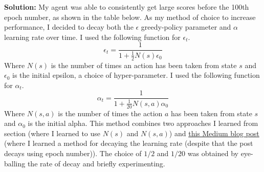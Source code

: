 \documentclass[submit]{harvardml}
\begin{document}
\newpage
\textbf{Solution:}
My agent was able to consistently get large scores before the 100th epoch number, as shown in the table below. As my method of choice to increase performance, I decided to decay both the $\epsilon$ greedy-policy parameter and $\alpha$ learning rate over time. I used the following function for $\epsilon_t$.
\begin{equation*}
    \epsilon_t = \frac{1}{1 + \frac{1}{2} N(s) \epsilon_0}
\end{equation*}
Where $N(s)$ is the number of times an action has been taken from state $s$ and $\epsilon_0$ is the initial epsilon, a choice of hyper-parameter. I used the following function for $\alpha_t$.
\begin{equation*}
    \alpha_t = \frac{1}{1 + \frac{1}{20} N(s,a) \alpha_0}
\end{equation*}
Where $N(s, a)$ is the number of times the action $a$ has been taken from state $s$ and $\alpha_0$ is the initial alpha. This method combines two approaches I learned from section (where I learned to use $N(s)$ and $N(s,a)$) and \href{https://medium.com/analytics-vidhya/learning-rate-decay-and-methods-in-deep-learning-2cee564f910b}{this Medium blog post} (where I learned a method for decaying the learning rate (despite that the post decays using epoch number)). The choice of $1/2$ and $1/20$ was obtained by eye-balling the rate of decay and briefly experimenting.
\end{document}
